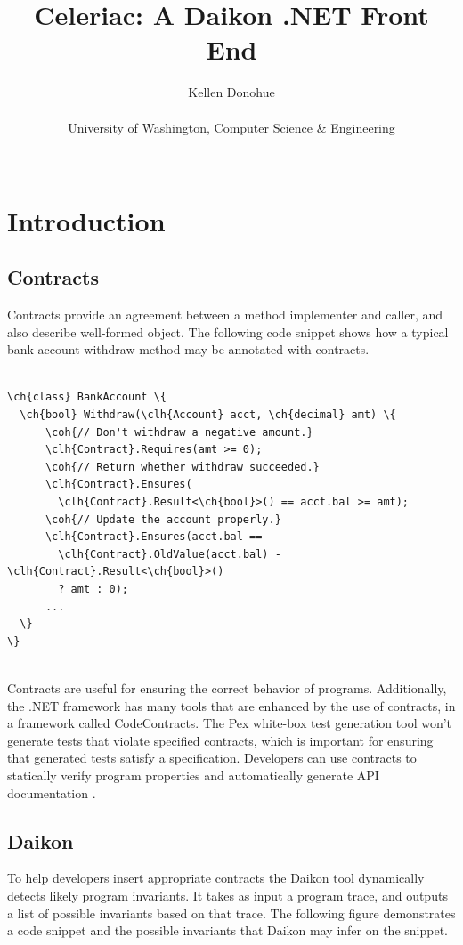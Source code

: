\documentclass{article}
\title{Celeriac: A Daikon .NET Front End}
\author{Kellen Donohue\\ \\
University of Washington, Computer Science \& Engineering\\ \\}
\newcommand\ch[1]{\textcolor[rgb]{0,0,1}{\textbf{#1}}}
\newcommand\clh[1]{\textcolor[rgb]{0,.5,1}{\textbf{#1}}}
\newcommand\coh[1]{\textcolor[rgb]{0,.6,0}{\textbf{#1}}}
\begin{document}
\maketitle

\section{Introduction}
\subsection{Contracts}
Contracts provide an agreement between a method implementer and caller, and also describe well-formed object. The following code snippet shows how a typical bank account withdraw method may be annotated with contracts.
\begin{center}
\begin{Verbatim}[commandchars=\\\{\}]

\ch{class} BankAccount \{
  \ch{bool} Withdraw(\clh{Account} acct, \ch{decimal} amt) \{
      \coh{// Don't withdraw a negative amount.}
      \clh{Contract}.Requires(amt >= 0);
      \coh{// Return whether withdraw succeeded.}
      \clh{Contract}.Ensures(
        \clh{Contract}.Result<\ch{bool}>() == acct.bal >= amt);
      \coh{// Update the account properly.}
      \clh{Contract}.Ensures(acct.bal ==
        \clh{Contract}.OldValue(acct.bal) - \clh{Contract}.Result<\ch{bool}>()
        ? amt : 0);
      ...
  \}
\}
\end{Verbatim}
\end{center} 
\  \\
Contracts are useful for ensuring the correct behavior of programs. Additionally, the .NET framework has many tools that are enhanced by the use of contracts, in a framework called CodeContracts. The Pex white-box test generation tool \cite{pex} won't generate tests that violate specified contracts, which is important for ensuring that generated tests satisfy a specification. Developers can use contracts to statically verify program properties \cite{static} and automatically generate API documentation \cite{contracts}.

\subsection{Daikon}
To help developers insert appropriate contracts the Daikon tool \cite{daikon} dynamically detects likely program invariants. It takes as input a program trace, and outputs a list of possible invariants based on that trace.  The following figure demonstrates a code snippet and the possible invariants that Daikon may infer on the snippet.
\end{document}
